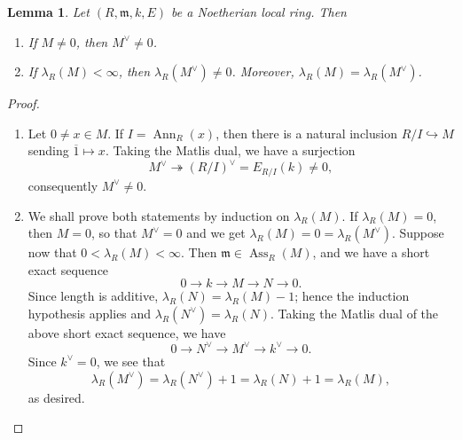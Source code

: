 \documentclass[10pt]{article}
\theoremstyle{thmstyle}
\newtheorem{lemma}[theorem]{Lemma}
\theoremstyle{defstyle}
\newcommand{\Ann}{\operatorname{Ann}}
\newcommand{\frakm}{\mathfrak{m}} %
\newcommand{\onto}{\twoheadrightarrow}
\newcommand{\into}{\hookrightarrow}
\newcommand{\Ass}{\operatorname{Ass}}
\begin{document}
\begin{lemma}
    Let $(R,\frakm,k, E)$ be a Noetherian local ring. Then 
    \begin{enumerate}[label=(\arabic*)]
        \item If $M\ne 0$, then $M^\vee\ne 0$. 
        \item If $\lambda_R(M) < \infty$, then $\lambda_R(M^\vee)\ne 0$. Moreover, $\lambda_R(M) = \lambda_R(M^\vee)$.
    \end{enumerate}
\end{lemma}
\begin{proof}
\begin{enumerate}[label=(\arabic*)]
    \item Let $0\ne x\in M$. If $I = \Ann_R(x)$, then there is a natural inclusion $R/I\into M$ sending $\overline 1\mapsto x$. Taking the Matlis dual, we have a surjection 
    \begin{equation*}
        M^\vee\onto \left(R/I\right)^\vee = E_{R/I}(k)\ne 0,
    \end{equation*}
    consequently $M^\vee\ne 0$.

    \item We shall prove both statements by induction on $\lambda_R(M)$. If $\lambda_R(M) = 0$, then $M = 0$, so that $M^\vee = 0$ and we get $\lambda_R(M) = 0 = \lambda_R(M^\vee)$. Suppose now that $0 < \lambda_R(M) < \infty$. Then $\frakm\in\Ass_R(M)$, and we have a short exact sequence 
    \begin{equation*}
        0\longrightarrow k \longrightarrow M\longrightarrow N\longrightarrow 0.
    \end{equation*}
    Since length is additive, $\lambda_R(N) = \lambda_R(M) - 1$; hence the induction hypothesis applies and $\lambda_R(N^\vee) = \lambda_R(N)$. Taking the Matlis dual of the above short exact sequence, we have
    \begin{equation*}
        0\longrightarrow N^\vee\longrightarrow M^\vee\longrightarrow k^\vee\longrightarrow 0.
    \end{equation*}
    Since $k^\vee = 0$, we see that 
    \begin{equation*}
        \lambda_R(M^\vee) = \lambda_R(N^\vee) + 1 = \lambda_R(N) + 1 = \lambda_R(M),
    \end{equation*}
    as desired. \qedhere
\end{enumerate}
\end{proof}
\end{document}
